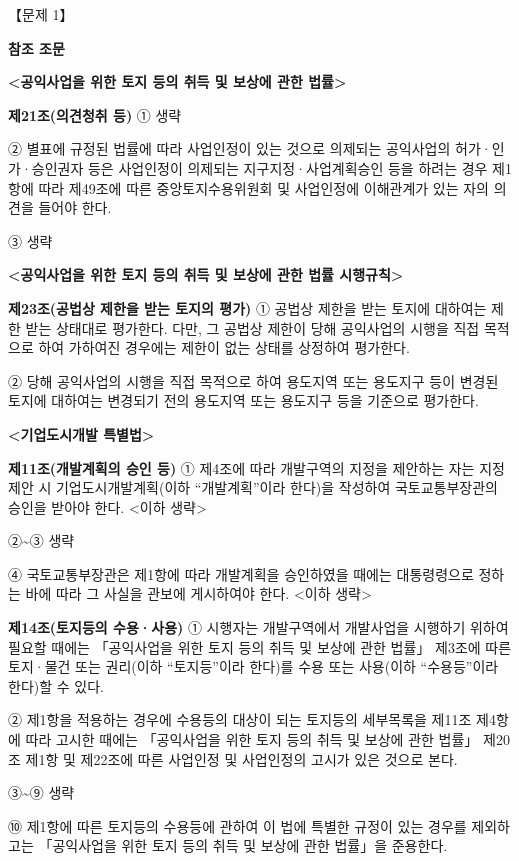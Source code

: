\begin{longquestion}{【문제 1】}
\medskip\noindent
\begin{framedtext}
\textbf{참조 조문} \par
\textbf{<공익사업을 위한 토지 등의 취득 및 보상에 관한 법률>} \par
\textbf{제21조(의견청취 등)} ① 생략 \par
② 별표에 규정된 법률에 따라 사업인정이 있는 것으로 의제되는 공익사업의 허가·인가·승인권자 등은 사업인정이 의제되는 지구지정·사업계획승인 등을 하려는 경우 제1항에 따라 제49조에 따른 중앙토지수용위원회 및 사업인정에 이해관계가 있는 자의 의견을 들어야 한다. \par
③ 생략 \par
\textbf{<공익사업을 위한 토지 등의 취득 및 보상에 관한 법률 시행규칙>} \par
\textbf{제23조(공법상 제한을 받는 토지의 평가)} ① 공법상 제한을 받는 토지에 대하여는 제한 받는 상태대로 평가한다. 다만, 그 공법상 제한이 당해 공익사업의 시행을 직접 목적으로 하여 가하여진 경우에는 제한이 없는 상태를 상정하여 평가한다. \par
② 당해 공익사업의 시행을 직접 목적으로 하여 용도지역 또는 용도지구 등이 변경된 토지에 대하여는 변경되기 전의 용도지역 또는 용도지구 등을 기준으로 평가한다. \par
\textbf{<기업도시개발 특별법>} \par
\textbf{제11조(개발계획의 승인 등)} ① 제4조에 따라 개발구역의 지정을 제안하는 자는 지정 제안 시 기업도시개발계획(이하 “개발계획”이라 한다)을 작성하여 국토교통부장관의 승인을 받아야 한다. <이하 생략> \par
②\textasciitilde{}③ 생략 \par
④ 국토교통부장관은 제1항에 따라 개발계획을 승인하였을 때에는 대통령령으로 정하는 바에 따라 그 사실을 관보에 게시하여야 한다. <이하 생략> \par
\textbf{제14조(토지등의 수용·사용)} ① 시행자는 개발구역에서 개발사업을 시행하기 위하여 필요할 때에는 「공익사업을 위한 토지 등의 취득 및 보상에 관한 법률」 제3조에 따른 토지·물건 또는 권리(이하 “토지등”이라 한다)를 수용 또는 사용(이하 “수용등”이라 한다)할 수 있다. \par
② 제1항을 적용하는 경우에 수용등의 대상이 되는 토지등의 세부목록을 제11조 제4항에 따라 고시한 때에는 「공익사업을 위한 토지 등의 취득 및 보상에 관한 법률」 제20조 제1항 및 제22조에 따른 사업인정 및 사업인정의 고시가 있은 것으로 본다. \par
③\textasciitilde{}⑨ 생략 \par
⑩ 제1항에 따른 토지등의 수용등에 관하여 이 법에 특별한 규정이 있는 경우를 제외하고는 「공익사업을 위한 토지 등의 취득 및 보상에 관한 법률」을 준용한다.
\end{framedtext}
\end{longquestion}
